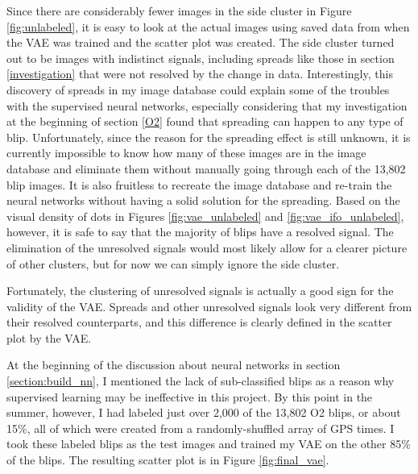 \documentclass[a4paper]{article}
\begin{document}
Since there are considerably fewer images in the side cluster in Figure \ref{fig:unlabeled}, it is easy to look at the actual images using saved data from when the VAE was trained and the scatter plot was created. The side cluster turned out to be images with indistinct signals, including spreads like those in section \ref{investigation} that were not resolved by the change in data. Interestingly, this discovery of spreads in my image database could explain some of the troubles with the supervised neural networks, especially considering that my investigation at the beginning of section \ref{O2} found that spreading can happen to any type of blip. Unfortunately, since the reason for the spreading effect is still unknown, it is currently impossible to know how many of these images are in the image database and eliminate them without manually going through each of the 13,802 blip images. It is also fruitless to recreate the image database and re-train the neural networks without having a solid solution for the spreading. Based on the visual density of dots in Figures \ref{fig:vae_unlabeled} and \ref{fig:vae_ifo_unlabeled}, however, it is safe to say that the majority of blips have a resolved signal. The elimination of the unresolved signals would most likely allow for a clearer picture of other clusters, but for now we can simply ignore the side cluster. 

Fortunately, the clustering of unresolved signals is actually a good sign for the validity of the VAE. Spreads and other unresolved signals look very different from their resolved counterparts, and this difference is clearly defined in the scatter plot by the VAE. 

At the beginning of the discussion about neural networks in section \ref{section:build_nn}, I mentioned the lack of sub-classified blips as a reason why supervised learning may be ineffective in this project. By this point in the summer, however, I had labeled just over 2,000 of the 13,802 O2 blips, or about 15\%, all of which were created from a randomly-shuffled array of GPS times. I took these labeled blips as the test images and trained my VAE on the other 85\% of the blips. The resulting scatter plot is in Figure \ref{fig:final_vae}. 
\end{document}
